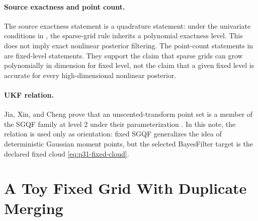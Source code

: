 \documentclass[11pt]{article}
\numberwithin{equation}{section}
\begin{document}
\paragraph{Source exactness and point count.}
The source exactness statement is a quadrature statement: under the univariate
conditions in \citet[Theorem 3.1]{jia2012sparsegrid}, the sparse-grid rule
inherits a polynomial exactness level.  This does not imply exact nonlinear
posterior filtering.  The point-count statements in
\citet[Proposition 3.1--3.2]{jia2012sparsegrid} are fixed-level statements.
They support the claim that sparse grids can grow polynomially in dimension
for fixed level, not the claim that a given fixed level is accurate for every
high-dimensional nonlinear posterior.

\paragraph{UKF relation.}
Jia, Xin, and Cheng prove that an unscented-transform point set is a member of
the SGQF family at level 2 under their parameterization
\cite[Theorem 3.2]{jia2012sparsegrid}.  In this note, the relation is used only
as orientation: fixed SGQF generalizes the idea of deterministic Gaussian
moment points, but the selected BayesFilter target is the declared fixed cloud
\eqref{eq:p31-fixed-cloud}.

\section{A Toy Fixed Grid With Duplicate Merging}
\label{sec:p31-toy-grid}
\end{document}
